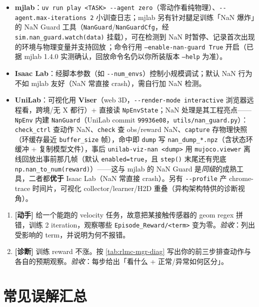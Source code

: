 \begin{itemize}
  \item \textbf{mjlab}：\verb|uv run play <TASK> --agent zero|（零动作看纯物理）、\verb|--agent.max-iterations 2| 小训查日志；mjlab 另有针对腿足训练「NaN 爆炸」的 NaN Guard 工具（\texttt{NanGuard}/\texttt{NanGuardCfg}，经 \texttt{sim.nan\_guard.watch(data)} 挂载），可在检测到 NaN 时暂停、记录首次出现的环境与物理变量并支持回放\,\cite{mjlab2026}；命令行用 \texttt{--enable-nan-guard True} 开启（已据 mjlab 1.4.0 实测确认，回放命令名仍以你所装版本 \texttt{--help} 为准）。
  \item \textbf{Isaac Lab}：经脚本参数（如 \verb|--num_envs|）控制小规模调试；默认 NaN 行为不如 mjlab 友好（NaN 常直接 crash），需自行加 NaN 检测。
  \item \textbf{UniLab}：可视化用 \textbf{Viser}（web 3D，\verb|--render-mode interactive| 浏览器远程看，跨境/无 X 都行）+ 直接读 \verb|NpEnvState|；NaN 处理是其工程亮点——\verb|NpEnv| 内建 \verb|NanGuard|（UniLab commit \texttt{99936e08}，\texttt{utils/nan\_guard.py}）：\verb|check_ctrl| 查动作 NaN、\verb|check| 查 obs/reward NaN、\verb|capture| 存物理快照（环缓存最近 \verb|buffer_size| 帧），命中即 \verb|dump| 写 \verb|nan_dump_*.npz|（含状态环缓冲 + 复制模型文件），事后 \verb|unilab-viz-nan <dump>| 用 \verb|mujoco.viewer| 离线回放出事前那几帧（默认 \verb|enabled=true|，且 \verb|step()| 末尾还有兜底 \verb|np.nan_to_num(reward)|）——这与 mjlab 的 NaN Guard 是\emph{同级}的成熟工具，二者都\textbf{优于} Isaac Lab（NaN 常直接 crash）。另有 \verb|--profile| 产 chrome-trace 时间片，可视化 collector/learner/H2D 重叠（异构架构特供的诊断视角）。
\end{itemize}

\begin{practice}[本节练习]
\begin{enumerate}
  \item \textbf{[动手]} 给一个能跑的 velocity 任务，故意把某接触传感器的 geom regex 拼错，训练 2 iteration，观察哪些 \verb|Episode_Reward/<term>| 变为零。\emph{验收}：列出受影响的 term，并说明为何不报错。
  \item \textbf{[诊断]} 训练 reward 不涨。按 \cref{tab:rlmc-mgr-diag} 写出你的前三步排查动作与各自的预期观察。\emph{验收}：每步给出「看什么 + 正常/异常如何区分」。
\end{enumerate}
\end{practice}

\section*{常见误解汇总}
\label{sec:rlmc-mgr-misconceptions}

